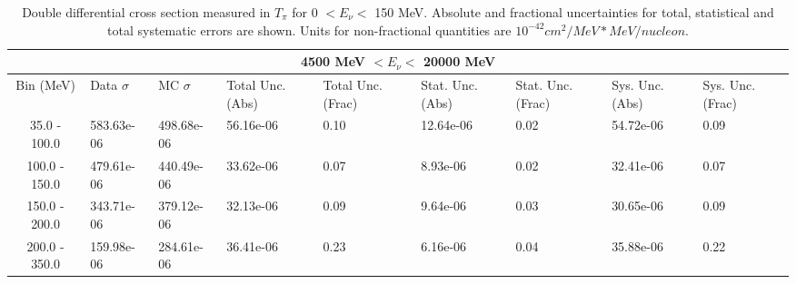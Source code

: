 \begin{table}[!htb]
    \centering
    \tiny
    \begin{tabular}{|c|p{0.5in}|p{0.5in}|p{0.5in}|p{0.5in}|p{0.5in}|p{0.5in}|p{0.5in}|p{0.5in}|}

        \hline
        \multicolumn{9}{c}{4500 MeV $ < E_\nu < $ 20000 MeV}\\
        \hline
        Bin (MeV)& Data $\sigma$ & MC $\sigma$ & Total Unc. (Abs) & Total Unc. (Frac)  & Stat. Unc. (Abs) & Stat. Unc. (Frac) & Sys. Unc. (Abs) & Sys. Unc. (Frac)\\ \hline
35.0 - 100.0 & 583.63e-06 & 498.68e-06 & 56.16e-06 & 0.10 & 12.64e-06 & 0.02 & 54.72e-06 & 0.09\\ \hline
100.0 - 150.0 & 479.61e-06 & 440.49e-06 & 33.62e-06 & 0.07 & 8.93e-06 & 0.02 & 32.41e-06 & 0.07\\ \hline
150.0 - 200.0 & 343.71e-06 & 379.12e-06 & 32.13e-06 & 0.09 & 9.64e-06 & 0.03 & 30.65e-06 & 0.09\\ \hline
200.0 - 350.0 & 159.98e-06 & 284.61e-06 & 36.41e-06 & 0.23 & 6.16e-06 & 0.04 & 35.88e-06 & 0.22\\ \hline

    \end{tabular}
    \caption{Double differential cross section measured in $T_\pi$ for 0 $ < E_\nu < $ 150 MeV. Absolute and fractional uncertainties for total, statistical and total systematic errors are shown. Units for non-fractional quantities are $10^{-42}cm^2/MeV*MeV/nucleon$.}
    \label{tab:ApdxA:XSecTable2Dtpienu2}
\end{table}






















